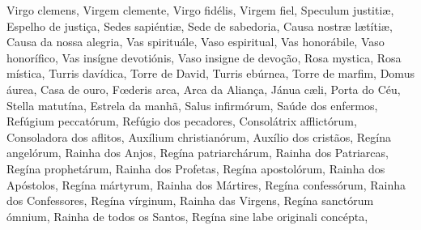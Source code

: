 \begin{paracol}{2}
\switchcolumn*
Virgo clemens,
\switchcolumn
Virgem clemente,
\switchcolumn*
Virgo fidélis,
\switchcolumn
Virgem fiel,
\switchcolumn*
Speculum justitiæ,
\switchcolumn
Espelho de justiça,
\switchcolumn*
Sedes sapiéntiæ,
\switchcolumn
Sede de sabedoria,
\switchcolumn*
Causa nostræ lætítiæ,
\switchcolumn
Causa da nossa alegria,
\switchcolumn*
Vas spirituále,
\switchcolumn
Vaso espiritual,
\switchcolumn*
Vas honorábile,
\switchcolumn
Vaso honorífico,
\switchcolumn*
Vas insígne devotiónis,
\switchcolumn
Vaso insigne de devoção,
\switchcolumn*
Rosa mystica,
\switchcolumn
Rosa mística,
\switchcolumn*
Turris davídica,
\switchcolumn
Torre de David,
\switchcolumn*
Turris ebúrnea,
\switchcolumn
Torre de marfim,
\switchcolumn*
Domus áurea,
\switchcolumn
Casa de ouro,
\switchcolumn*
Fœderis arca,
\switchcolumn
Arca da Aliança,
\switchcolumn*
Jánua cæli,
\switchcolumn
Porta do Céu,
\switchcolumn*
Stella matutína,
\switchcolumn
Estrela da manhã,
\switchcolumn*
Salus infirmórum,
\switchcolumn
Saúde dos enfermos,
\switchcolumn*
Refúgium peccatórum,
\switchcolumn
Refúgio dos pecadores,
\switchcolumn*
Consolátrix afflictórum,
\switchcolumn
Consoladora dos aflitos,
\switchcolumn*
Auxílium christianórum,
\switchcolumn
Auxílio dos cristãos,
\switchcolumn*
Regína angelórum,
\switchcolumn
Rainha dos Anjos,
\switchcolumn*
Regína patriarchárum,
\switchcolumn
Rainha dos Patriarcas,
\switchcolumn*
Regína prophetárum,
\switchcolumn
Rainha dos Profetas,
\switchcolumn*
Regína apostolórum,
\switchcolumn
Rainha dos Apóstolos,
\switchcolumn*
Regína mártyrum,
\switchcolumn
Rainha dos Mártires,
\switchcolumn*
Regína confessórum,
\switchcolumn
Rainha dos Confessores,
\switchcolumn*
Regína vírginum,
\switchcolumn
Rainha das Virgens,
\switchcolumn*
Regína sanctórum ómnium,
\switchcolumn
Rainha de todos os Santos,
\switchcolumn*
Regína sine labe originali concépta,

\end{paracol}
